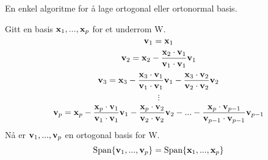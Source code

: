 En enkel algoritme for å lage ortogonal eller ortonormal basis.

Gitt en basis $\mathbf{x}_1, ..., \mathbf{x}_p$ for et underrom W.
$$\mathbf{v}_1 = \mathbf{x}_1$$
$$\mathbf{v}_2 = \mathbf{x}_2 - \frac{\mathbf{x}_2\cdot\mathbf{v}_1}{\mathbf{v}_1\cdot\mathbf{v}_1}\mathbf{v}_1$$
$$\mathbf{v}_3 = \mathbf{x}_3
  - \frac{\mathbf{x}_3\cdot\mathbf{v}_1}{\mathbf{v}_1\cdot\mathbf{v}_1}\mathbf{v}_1
  - \frac{\mathbf{x}_3\cdot\mathbf{v}_2}{\mathbf{v}_2\cdot\mathbf{v}_2}\mathbf{v}_2$$
$$\vdots$$
$$\mathbf{v}_p = \mathbf{x}_p
  - \frac{\mathbf{x}_p\cdot\mathbf{v}_1}{\mathbf{v}_1\cdot\mathbf{v}_1}\mathbf{v}_1
  - \frac{\mathbf{x}_p\cdot\mathbf{v}_2}{\mathbf{v}_2\cdot\mathbf{v}_2}\mathbf{v}_2
  - ...
  - \frac{\mathbf{x}_p\cdot\mathbf{v}_{p-1}}{\mathbf{v}_{p-1}\cdot\mathbf{v}_{p-1}}\mathbf{v}_{p-1}$$
Nå er $\mathbf{v}_1, ..., \mathbf{v}_p$ en ortogonal basis for W.
$$\text{Span}\{\mathbf{v}_1, ..., \mathbf{v}_p\} = \text{Span}\{\mathbf{x}_1, ..., \mathbf{x}_p\}$$
